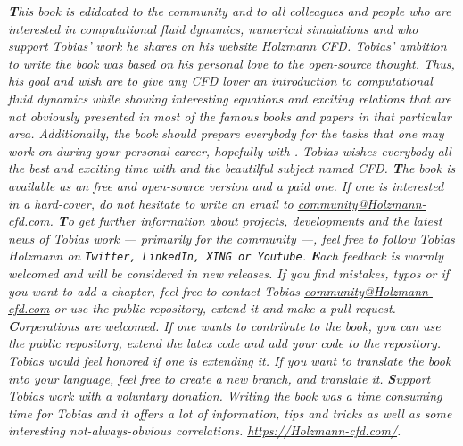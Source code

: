 %
%
\newpage
%
%
\textit{
    \textbf{T}his book is edidcated to the \OF community and to all colleagues
    and people who are interested in computational fluid dynamics, numerical
    simulations and who support Tobias' work he shares on his website Holzmann
    CFD. Tobias' ambition to write the book was based on his personal love to
    the open-source thought. Thus, his goal and wish are to give any CFD lover
    an introduction to computational fluid dynamics while showing interesting
    equations and exciting relations that are not obviously presented in most
    of the famous books and papers in that particular area. Additionally, the
    book should prepare everybody for the tasks that one may work on during
    your personal career, hopefully with \OF. Tobias wishes everybody all the
    best and exciting time with \OF and the beautilful subject named CFD.
}
%
%
\vspace{20pt}
%
%
\textit{
    \textbf{T}he book is available as an free and open-source version and a paid
    one. If one is interested in a hard-cover, do not hesitate to write an email
    to \href{mailto:community@Holzmann-cfd.com}{\color{myCiteColor}community@Holzmann-cfd.com}.
}
%
%
\vspace{20pt}
%
%
\textit{
    \textbf{T}o get further information about projects, developments and the
    latest news of Tobias work --- primarily for the community ---, feel free to
    follow Tobias Holzmann on \texttt{Twitter, LinkedIn, XING or Youtube}.
}
%
%
\vspace{20pt}
%
%
\textit{
    \textbf{E}ach feedback is warmly welcomed and will be considered in new
    releases. If you find mistakes, typos or if you want to add a chapter,
    feel free to contact Tobias \href{mailto:community@Holzmann-cfd.com}{\color{myCiteColor}community@Holzmann-cfd.com}
    or use the public repository, extend it and make a pull request.
}
%
%
\vspace{20pt}
%
%
\textit{
    \textbf{C}orperations are welcomed. If one wants to contribute to the book,
    you can use the public repository, extend the latex code and add your
    code to the repository. Tobias would feel honored if one is extending it.
    If you want to translate the book into your language, feel free to create
    a new branch, and translate it.
}
%
%
\vspace{20pt}
%
%
\textit{
    \textbf{S}upport Tobias work with a voluntary donation. Writing the book
    was a time consuming time for Tobias and it offers a lot of information,
    tips and tricks as well as some interesting not-always-obvious correlations.
    \url{https://Holzmann-cfd.com/}.
}
%
%
\newpage


